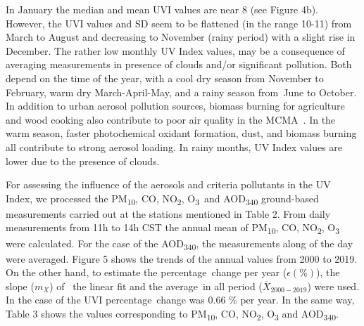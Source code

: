 \documentclass{article}
\begin{document}
{In January the median and mean UVI values are near 8 (see Figure 4b).%
However, the UVI values and SD
seem to be flattened (in the range 10-11) from March to August and
decreasing to November (rainy period) with a slight rise in December.
The rather low monthly UV Index values, may be a consequence of
averaging measurements in presence of clouds and/or significant
pollution. Both depend on the time of the year, with a cool dry season
from November to February, warm dry March-April-May, and a rainy season
from~June to October. In addition to urban aerosol pollution sources,
biomass burning for agriculture and wood cooking also contribute to poor
air quality in the MCMA~\cite{Retama_2015}. In the warm season, faster
photochemical oxidant formation, dust, and biomass burning all
contribute to strong aerosol loading. In rainy months, UV Index values
are lower due to the presence of clouds.~

For assessing the influence of the aerosols and criteria pollutants in
the UV Index, we processed the PM\textsubscript{10}, CO,
NO\textsubscript{2}, O\textsubscript{3}~and AOD\textsubscript{340}
ground-based measurements carried out at the stations mentioned in Table
2. From daily measurements from 11h to 14h CST the annual mean of
PM\textsubscript{10}, CO, NO\textsubscript{2}, O\textsubscript{3} were
calculated. For the case of the AOD\textsubscript{340}, the measurements
along of the day were averaged. Figure 5 %
shows the trends of the annual values from 2000 to 2019. On the other
hand, to estimate the percentage~change per year (\(\epsilon\left(\%\right)\)),
the slope (\(m_ {X}\)) of~ the linear fit and the average~in all
period (\(\overline{X}_{2000-2019}\)) were used. In the case of the UVI
percentage~change was 0.66 \% per year. In the same way, Table 3 shows
the values corresponding to PM\textsubscript{10}, CO,
NO\textsubscript{2}, O\textsubscript{3} and AOD\textsubscript{340}.~

}
\end{document}
